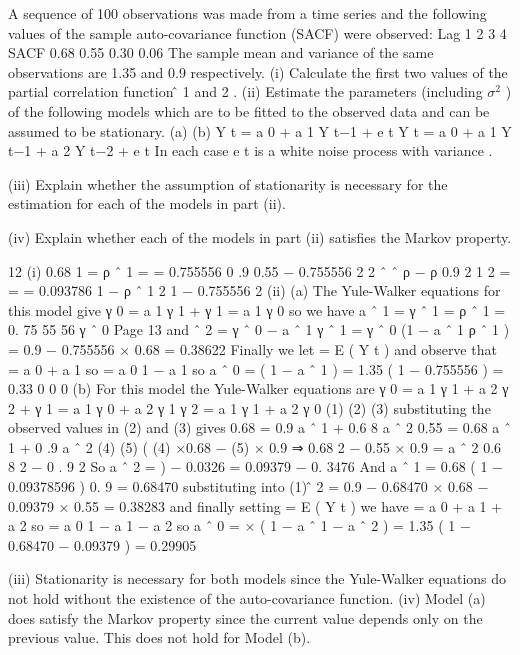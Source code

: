 \documentclass[a4paper,12pt]{article}
\begin{document}
\begin{enumerate}

A sequence of 100 observations was made from a time series and the following values
of the sample auto-covariance function (SACF) were observed:
Lag
1
2
3
4
SACF
0.68
0.55
0.30
0.06
The sample mean and variance of the same observations are 1.35 and 0.9 respectively.
(i) Calculate the first two values of the partial correlation function \phî 1 and \hat{\phi} 2 . 
(ii) Estimate the parameters (including $\sigma^2$ ) of the following models which are to
be fitted to the observed data and can be assumed to be stationary.
(a)
(b)
Y t = a 0 + a 1 Y t−1 + e t
Y t = a 0 + a 1 Y t−1 + a 2 Y t−2 + e t
In each case e t is a white noise process with variance  .

(iii) Explain whether the assumption of stationarity is necessary for the estimation
for each of the models in part (ii).

(iv) Explain whether each of the models in part (ii) satisfies the Markov property.

\newpage

12
(i)
0.68
\hat{\phi} 1 = ρ ˆ 1 =
= 0.755556
0 .9
0.55
− 0.755556 2
2
ˆ
ˆ
ρ
−
ρ
0.9
2
1
\hat{\phi} 2 =
=
= 0.093786
1 − ρ ˆ 1 2
1 − 0.755556 2
(ii)
(a)
The Yule-Walker equations for this model give
γ 0 = a 1 γ 1 + 
γ 1 = a 1 γ 0
so we have a ˆ 1 =
γ ˆ 1
= ρ ˆ 1 = 0. 75 55 56
γ ˆ 0
Page 13%
and \sigma ˆ 2 = γ ˆ 0 − a ˆ 1 γ ˆ 1 = γ ˆ 0 (1 − a ˆ 1 ρ ˆ 1 )
= 0.9 − 0.755556 × 0.68 = 0.38622
Finally we let \mu = E ( Y t ) and observe that
\mu = a 0 + a 1 \mu
so \mu =
a 0
1 − a 1
so a ˆ 0 = \hat{\mu} ( 1 − a ˆ 1 ) = 1.35 ( 1 − 0.755556 ) = 0.33 0 0 0
(b)
For this model the Yule-Walker equations are
γ 0 = a 1 γ 1 + a 2 γ 2 + 
γ 1 = a 1 γ 0 + a 2 γ 1
γ 2 = a 1 γ 1 + a 2 γ 0
(1)
(2)
(3)
substituting the observed values in (2) and (3) gives
0.68 = 0.9 a ˆ 1 + 0.6 8 a ˆ 2
0.55 = 0.68 a ˆ 1 + 0 .9 a ˆ 2
(4)
(5)
(
(4) ×0.68 − (5) × 0.9 ⇒ 0.68 2 − 0.55 × 0.9 = a ˆ 2 0.6 8 2 − 0 . 9 2
So a ˆ 2 =
)
− 0.0326
= 0.09379
− 0. 3476
And a ˆ 1 =
0.68 ( 1 − 0.09378596 )
0. 9
= 0.68470
substituting into (1)
\sigmâ 2 = 0.9 − 0.68470 × 0.68 − 0.09379 × 0.55 = 0.38283
and finally setting \mu = E ( Y t ) we have \mu = a 0 + a 1 \mu + a 2 \mu
so \mu =
a 0
1 − a 1 − a 2
so a ˆ 0 = \hat{\mu} × ( 1 − a ˆ 1 − a ˆ 2 ) = 1.35 ( 1 − 0.68470 − 0.09379 ) = 0.29905

(iii) Stationarity is necessary for both models since the Yule-Walker equations do not hold without the existence of the auto-covariance function.
(iv) Model (a) does satisfy the Markov property since the current value depends only on the previous value. This does not hold for Model (b).



\end{enumerate}
\end{document}

